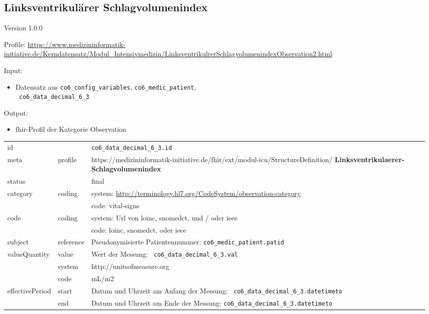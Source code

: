 \subsection{Linksventrikulärer Schlagvolumenindex} 
\noindent Version 1.0.0

\noindent Profile: \url{https://www.medizininformatik-initiative.de/Kerndatensatz/Modul_Intensivmedizin/LinksventrikulrerSchlagvolumenindexObservation2.html}

\noindent Input:
\begin{itemize}
	\item Datensatz aus \texttt{co6\_config\_variables}, \texttt{co6\_medic\_patient}, \\ \texttt{
co6\_data\_decimal\_6\_3}
\end{itemize}
Output:
\begin{itemize}
        \item \ac{fhir}-Profil der Kategorie \glqq Observation\grqq{}
\end{itemize}
\begin{longtable}{|l|l|p{7.5cm}|}
        \hline
        \rowcolor{lightgray} \multicolumn{3}{|l|}{Data Mapping (inhaltlich)} \\ \hline
        id &  & \texttt{co6\_data\_decimal\_6\_3.id} \\ \hline
	meta & profile & https://medizininformatik-initiative.de/fhir/ext/modul-icu/StructureDefinition/\textbf{
Linksventrikulaerer-Schlagvolumenindex} \\ \hline 
	status &  & final  \\ \hline 
	category & coding & system: \url{http://terminology.hl7.org/CodeSystem/observation-category} \\
\cline{3-3}
	& & code: vital-signs \\ \hline
	code & coding & system: Url von \ac{loinc}, \ac{snomedct}, und / oder \ac{ieee} \\ 
	\cline{3-3} 
	 &  & code: \ac{loinc}, \ac{snomedct}, oder \ac{ieee} \\ \hline
	subject & reference & Pseudonymisierte Patientennummer: \texttt{co6\_medic\_patient.patid} \\ \hline
	valueQuantity & value & Wert der Messung: \texttt{
co6\_data\_decimal\_6\_3.val} \\
        \cline{2-3}
         & system & http://unitsofmeasure.org \\
         \cline{2-3}
         & code & mL/m2 \\ \hline
    effectivePeriod & start & Datum und Uhrzeit am Anfang der Messung: \texttt{
co6\_data\_decimal\_6\_3.datetimeto} \\
    \cline{2-3}
     & end & Datum und Uhrzeit am Ende der Messung: \texttt{co6\_data\_decimal\_6\_3.datetimeto} \\ \hline
\end{longtable}


